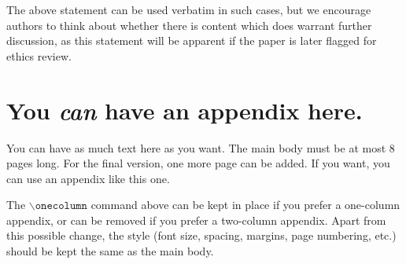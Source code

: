 \documentclass{article}
\theoremstyle{plain}
\theoremstyle{definition}
\theoremstyle{remark}
\begin{document}
The above statement can be used verbatim in such cases, but we encourage
authors to think about whether there is content which does warrant further
discussion, as this statement will be apparent if the paper is later flagged
for ethics review.

\nocite{langley00}




\newpage
\appendix
\onecolumn
\section{You \emph{can} have an appendix here.}

You can have as much text here as you want. The main body must be at most $8$
pages long. For the final version, one more page can be added. If you want, you
can use an appendix like this one.

The $\mathtt{\backslash onecolumn}$ command above can be kept in place if you
prefer a one-column appendix, or can be removed if you prefer a two-column
appendix.  Apart from this possible change, the style (font size, spacing,
margins, page numbering, etc.) should be kept the same as the main body.
\end{document}
